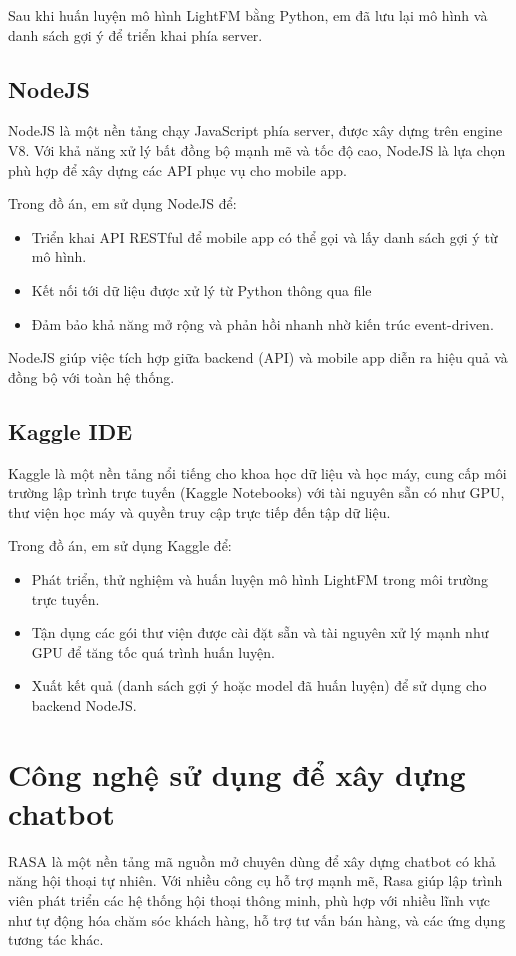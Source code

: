 \documentclass[../DoAn.tex]{subfiles}
\begin{document}
Sau khi huấn luyện mô hình LightFM bằng Python, em đã lưu lại mô hình và danh sách gợi ý để triển khai phía server.

\subsection{NodeJS\cite{NodeJS}}
NodeJS là một nền tảng chạy JavaScript phía server, được xây dựng trên engine V8. Với khả năng xử lý bất đồng bộ mạnh mẽ và tốc độ cao, NodeJS là lựa chọn phù hợp để xây dựng các API phục vụ cho mobile app.

Trong đồ án, em sử dụng NodeJS để:
\begin{itemize}
    \item Triển khai API RESTful để mobile app có thể gọi và lấy danh sách gợi ý từ mô hình.
    \item Kết nối tới dữ liệu được xử lý từ Python thông qua file
    \item Đảm bảo khả năng mở rộng và phản hồi nhanh nhờ kiến trúc event-driven.
\end{itemize}

NodeJS giúp việc tích hợp giữa backend (API) và mobile app diễn ra hiệu quả và đồng bộ với toàn hệ thống.

\subsection{Kaggle IDE\cite{Kaggle}}
Kaggle là một nền tảng nổi tiếng cho khoa học dữ liệu và học máy, cung cấp môi trường lập trình trực tuyến (Kaggle Notebooks) với tài nguyên sẵn có như GPU, thư viện học máy và quyền truy cập trực tiếp đến tập dữ liệu.

Trong đồ án, em sử dụng Kaggle để:
\begin{itemize}
    \item Phát triển, thử nghiệm và huấn luyện mô hình LightFM trong môi trường trực tuyến.
    \item Tận dụng các gói thư viện được cài đặt sẵn và tài nguyên xử lý mạnh như GPU để tăng tốc quá trình huấn luyện.
    \item Xuất kết quả (danh sách gợi ý hoặc model đã huấn luyện) để sử dụng cho backend NodeJS.
\end{itemize}
\section{Công nghệ sử dụng để xây dựng chatbot}
RASA \cite{RasaFramework} là một nền tảng mã nguồn mở chuyên dùng để xây dựng chatbot có khả năng hội thoại tự nhiên. Với nhiều công cụ hỗ trợ mạnh mẽ, Rasa giúp lập trình viên phát triển các hệ thống hội thoại thông minh, phù hợp với nhiều lĩnh vực như tự động hóa chăm sóc khách hàng, hỗ trợ tư vấn bán hàng, và các ứng dụng tương tác khác.
\end{document}
